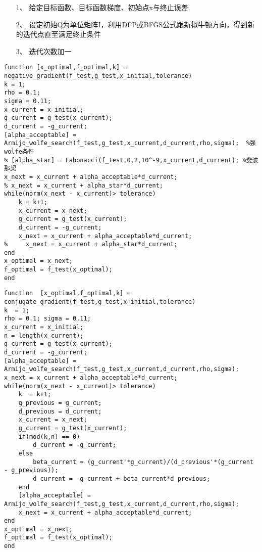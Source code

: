 \begin{itemize}
    \item[1、] 给定目标函数、目标函数梯度、初始点x与终止误差
    \item[2、] 设定初始Q为单位矩阵I，利用DFP或BFGS公式跟新拟牛顿方向，得到新的迭代点直至满足终止条件
    \item[3、] 迭代次数加一
\end{itemize}

\newpage
\begin{lstlisting}[style=matlab, title="梯度下降方法代码"]
function [x_optimal,f_optimal,k] = negative_gradient(f_test,g_test,x_initial,tolerance)
k = 1;
rho = 0.1;
sigma = 0.11;
x_current = x_initial;
g_current = g_test(x_current);
d_current = -g_current;
[alpha_acceptable] = Armijo_wolfe_search(f_test,g_test,x_current,d_current,rho,sigma);  %强wolfe条件
% [alpha_star] = Fabonacci(f_test,0,2,10^-9,x_current,d_current); %斐波那契
x_next = x_current + alpha_acceptable*d_current;
% x_next = x_current + alpha_star*d_current;
while(norm(x_next - x_current)> tolerance)
    k = k+1;
    x_current = x_next;
    g_current = g_test(x_current);
    d_current = -g_current;
    x_next = x_current + alpha_acceptable*d_current;
%     x_next = x_current + alpha_star*d_current;
end
x_optimal = x_next;
f_optimal = f_test(x_optimal);
end
\end{lstlisting}

\newpage
\begin{lstlisting}[style=matlab, title="共轭梯度方法代码"]
function  [x_optimal,f_optimal,k] = conjugate_gradient(f_test,g_test,x_initial,tolerance)
k  = 1;
rho = 0.1; sigma = 0.11;
x_current = x_initial;
n = length(x_current);
g_current = g_test(x_current);
d_current = -g_current;
[alpha_acceptable] = Armijo_wolfe_search(f_test,g_test,x_current,d_current,rho,sigma);
x_next = x_current + alpha_acceptable*d_current;
while(norm(x_next - x_current)> tolerance)
    k  = k+1;
    g_previous = g_current;
    d_previous = d_current;
    x_current = x_next;
    g_current = g_test(x_current);
    if(mod(k,n) == 0)
        d_current = -g_current;
    else
        beta_current = (g_current'*g_current)/(d_previous'*(g_current - g_previous));
        d_current = -g_current + beta_current*d_previous;
    end
    [alpha_acceptable] = Armijo_wolfe_search(f_test,g_test,x_current,d_current,rho,sigma);
    x_next = x_current + alpha_acceptable*d_current;
end
x_optimal = x_next;
f_optimal = f_test(x_optimal);
end
\end{lstlisting}

